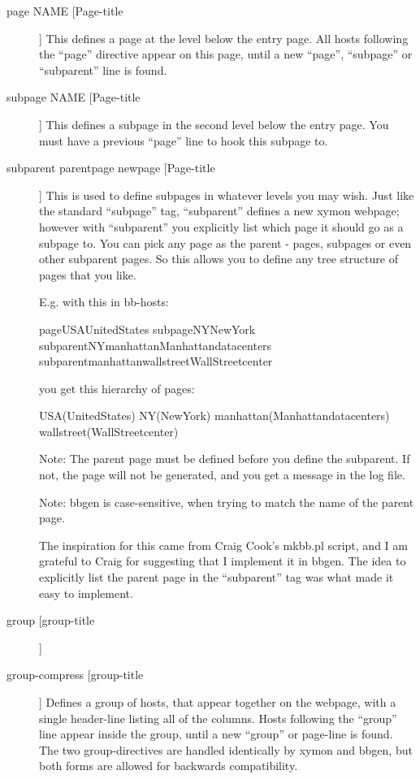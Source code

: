  \begin{description}
\item[page NAME [Page-title]] This defines a page at the level below
  the entry page. All hosts following the ``page'' directive appear on
  this page, until a new ``page'', ``subpage'' or ``subparent'' line
  is found. 


 

\item[subpage NAME [Page-title]] This defines a subpage in the second
  level below the entry page. You must have a previous ``page'' line
  to hook this subpage to. 


 

\item[subparent parentpage newpage [Page-title]] This is used to
  define subpages in whatever levels you may wish. Just like the
  standard ``subpage'' tag, ``subparent'' defines a new xymon
  webpage; however with ``subparent'' you explicitly list which page
  it should go as a subpage to. You can pick any page as the parent -
  pages, subpages or even other subparent pages. So this allows you to
  define any tree structure of pages that you like. 


  E.g. with this in bb-hosts: 


  
pageUSAUnitedStates  
subpageNYNewYork  
subparentNYmanhattanManhattandatacenters  
subparentmanhattanwallstreetWallStreetcenter 


  you get this hierarchy of pages: 


  
USA(UnitedStates)  
NY(NewYork)  
manhattan(Manhattandatacenters)  
wallstreet(WallStreetcenter) 


  Note: The parent page must be defined before you define the
  subparent. If not, the page will not be generated, and you get a
  message in the log file. 



  Note: bbgen is case-sensitive, when trying to match the name of the parent page. 


  The inspiration for this came from Craig Cook's mkbb.pl script, and
  I am grateful to Craig for suggesting that I implement it in
  bbgen. The idea to explicitly list the parent page in the
  ``subparent'' tag was what made it easy to implement. 



 

\item[group [group-title]]
\item[group-compress [group-title]] Defines a group of hosts, that
  appear together on the webpage, with a single header-line listing
  all of the columns. Hosts following the ``group'' line appear inside
  the group, until a new ``group'' or page-line is found. The two
  group-directives are handled identically by xymon and bbgen, but
  both forms are allowed for backwards compatibility. 



\end{description}
